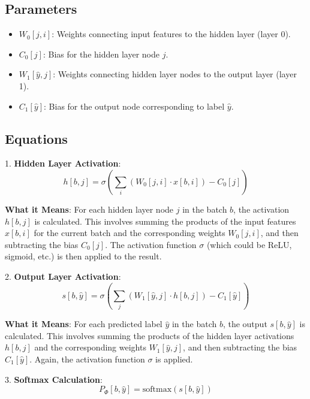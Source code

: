 \documentclass{article}
\begin{document}
\subsection{Parameters}
\begin{itemize}
    \item \( W_0[j, i] \): Weights connecting input features to the hidden layer (layer 0).
    \item \( C_0[j] \): Bias for the hidden layer node \( j \).
    \item \( W_1[\hat{y}, j] \): Weights connecting hidden layer nodes to the output layer (layer 1).
    \item \( C_1[\hat{y}] \): Bias for the output node corresponding to label \( \hat{y} \).
\end{itemize}

\subsection{Equations}
1. \textbf{Hidden Layer Activation}:
\begin{equation}
h[b, j] = \sigma\left(\sum_{i} (W_0[j, i] \cdot x[b, i]) - C_0[j]\right)
\end{equation}

\textbf{What it Means}: 
For each hidden layer node \( j \) in the batch \( b \), the activation \( h[b, j] \) is calculated. This involves summing the products of the input features \( x[b, i] \) for the current batch and the corresponding weights \( W_0[j, i] \), and then subtracting the bias \( C_0[j] \). The activation function \( \sigma \) (which could be ReLU, sigmoid, etc.) is then applied to the result.

2. \textbf{Output Layer Activation}:
\begin{equation}
s[b, \hat{y}] = \sigma\left(\sum_{j} (W_1[\hat{y}, j] \cdot h[b, j]) - C_1[\hat{y}]\right)
\end{equation}

\textbf{What it Means}: For each predicted label \( \hat{y} \) in the batch \( b \), the output \( s[b, \hat{y}] \) is calculated. This involves summing the products of the hidden layer activations \( h[b, j] \) and the corresponding weights \( W_1[\hat{y}, j] \), and then subtracting the bias \( C_1[\hat{y}] \). Again, the activation function \( \sigma \) is applied.

3. \textbf{Softmax Calculation}:
\begin{equation}
P_{\Phi}[b, \hat{y}] = \text{softmax}(s[b, \hat{y}])
\end{equation}
\end{document}
